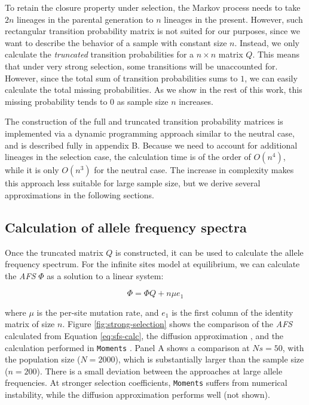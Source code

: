 \documentclass[review]{elsarticle}
\begin{document}
To retain the closure property under selection, the Markov process needs to take $2n$ lineages in
the parental generation to $n$ lineages in the present. However, such rectangular transition
probability matrix is not suited for our purposes, since we want to describe the behavior of a
sample with constant size $n$. Instead, we only calculate the \textit{truncated} transition
probabilities for a $n \times n$ matrix $Q$. This means that under very strong selection, some
transitions will be unaccounted for. However, since the total sum of transition probabilities sums
to $1$, we can easily calculate the total missing probabilities. As we show in the rest of this
work, this missing probability tends to $0$ as sample size $n$ increases.

The construction of the full and truncated transition probability matrices is implemented via a
dynamic programming approach similar to the neutral case, and is described fully in
appendix B. Because we need to account for additional lineages in the selection case, the
calculation time is of the order of $O(n^4)$, while it is only $O(n^3)$ for the neutral case. The
increase in complexity makes this approach less suitable for large sample size, but we derive
several approximations in the following sections.

\subsection{Calculation of allele frequency spectra}
\label{subsec:afs}

Once the truncated matrix $Q$ is constructed, it can be used to calculate the allele frequency
spectrum. For the infinite sites model at equilibrium, we can calculate the \textit{AFS} $\Phi$ as a
solution to a linear system:

\begin{equation}
  \label{eq:sfs-calc}
  \Phi = \Phi Q + n \mu e_1
\end{equation}

where $\mu$ is the per-site mutation rate, and $e_1$ is the first column of the identity matrix of
size $n$. Figure \ref{fig:strong-selection} shows the comparison of the \textit{AFS} calculated from
Equation \eqref{eq:sfs-calc}, the diffusion approximation \cite[eq. 9.23]{Ewens2004}, and the
calculation performed in \texttt{Moments} \citep{JouganousEtAl2017}. Panel A shows a comparison at
$Ns=50$, with the population size ($N=2000$), which is substantially larger than the sample size
($n=200$). There is a small deviation between the approaches at large allele frequencies. At
stronger selection coefficients, \texttt{Moments} suffers from numerical instability, while the
diffusion approximation performs well (not shown).
\end{document}
